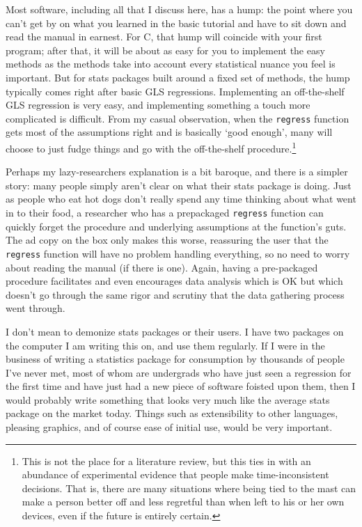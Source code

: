 Most software, including all that I discuss here, has a hump: the
point where you can't get by on what you learned in the basic tutorial
and have to sit down and read the manual in earnest. For C, that hump
will coincide with your first program; after that, it will be about as
easy for you to implement the easy methods as the methods take into account
every statistical nuance you feel is important. But for stats packages
built around a fixed set of methods, the hump typically comes right after
basic GLS regressions. Implementing an off-the-shelf GLS regression
is very easy, and implementing something a touch more complicated
is difficult.  From my casual observation,
when the {\tt regress} function gets most of the assumptions right and
is basically `good enough', many will choose to just fudge things and
go with the off-the-shelf procedure.\footnote{This is not the place for
a literature review, but this ties in with an abundance of experimental
evidence that people make time-inconsistent decisions. That is, there
are many situations where being tied to the mast can make a person
better off and less regretful than when left to his or her own devices,
even if the future is entirely certain.}

Perhaps my lazy-researchers explanation is a bit baroque, and there is
a simpler story: many people simply aren't clear on what their stats package is doing.
Just as people who eat hot dogs don't really spend any
time thinking about what went in to their food, a researcher who has
a prepackaged {\tt regress} function can quickly forget the procedure
and underlying assumptions at the function's guts.  The ad copy on the
box only makes this worse, reassuring the user that the {\tt regress}
function will have no problem handling everything, so no need to worry
about reading the manual (if there is one). Again, having a pre-packaged
procedure facilitates and even encourages data analysis which is OK
but which doesn't go through the same rigor and scrutiny that the data gathering
process went through.

I don't mean to demonize stats packages or their users. I have two
packages on the computer I am writing this on, and use them regularly.
If I
were in the business of writing a statistics package for consumption by
thousands of people I've never met, most of whom are undergrads who have
just seen a regression for the first time and have just had a new piece
of software foisted upon them, then I would probably write something
that looks very much like the average stats package on the market today.
Things such as extensibility to other languages, pleasing graphics,
and of course ease of initial use, would be very important.

